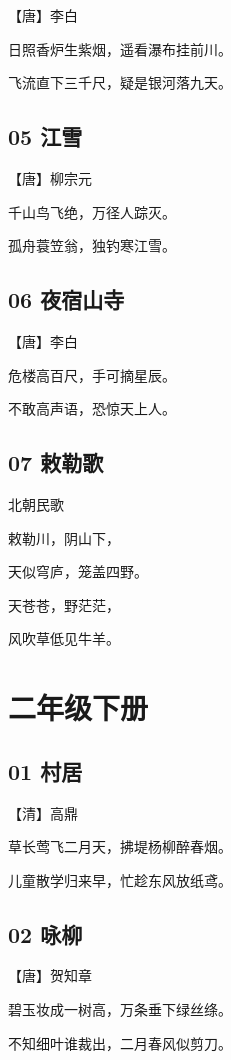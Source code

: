 \documentclass[a6paper, 12pt]{article}
\begin{document}
【唐】李白

日照香炉生紫烟，遥看瀑布挂前川。

飞流直下三千尺，疑是银河落九天。

\subsection*{05 江雪}

【唐】柳宗元

千山鸟飞绝，万径人踪灭。

孤舟蓑笠翁，独钓寒江雪。

\subsection*{06 夜宿山寺}

【唐】李白

危楼高百尺，手可摘星辰。

不敢高声语，恐惊天上人。

\subsection*{07 敕勒歌}

北朝民歌

敕勒川，阴山下，

天似穹庐，笼盖四野。

天苍苍，野茫茫，

风吹草低见牛羊。

\newpage

\section*{二年级下册}

\subsection*{01 村居}

【清】高鼎

草长莺飞二月天，拂堤杨柳醉春烟。

儿童散学归来早，忙趁东风放纸鸢。

\subsection*{02 咏柳}

【唐】贺知章

碧玉妆成一树高，万条垂下绿丝绦。

不知细叶谁裁出，二月春风似剪刀。
\end{document}
